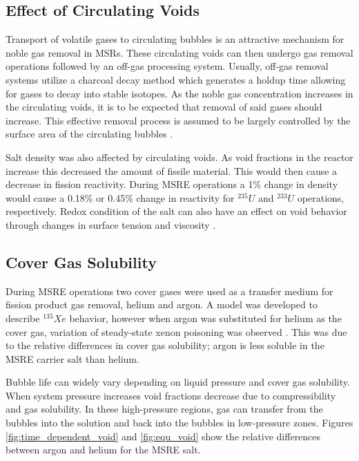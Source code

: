 \subsection{Effect of Circulating Voids}
Transport of volatile gases to circulating bubbles is an attractive mechanism for noble gas removal in MSRs. These circulating voids can then undergo gas removal operations followed by an off-gas processing system. Usually, off-gas removal systems utilize a charcoal decay method which generates a holdup time allowing for gases to decay into stable isotopes. As the noble gas concentration increases in the circulating voids, it is to be expected that removal of said gases should increase. This effective removal process is assumed to be largely controlled by the surface area of the circulating bubbles \cite{peebles1968}. 

Salt density was also affected by circulating voids. As void fractions in the reactor increase this decreased the amount of fissile material. This would then cause a decrease in fission reactivity. During MSRE operations a 1\% change in density would cause a 0.18\% or 0.45\% change in reactivity for ${}^{235}U$ and ${}^{233}U$ operations, respectively. Redox condition of the salt can also have an effect on void behavior through changes in surface tension and viscosity \cite{houtzeel1970}. 

\subsection{Cover Gas Solubility}

During MSRE operations two cover gases were used as a transfer medium for fission product gas removal, helium and argon. A model was developed to describe ${}^{135}Xe$ behavior, however when argon was substituted for helium as the cover gas, variation of steady-state xenon poisoning was observed \cite{engel1971}. This was due to the relative differences in cover gas solubility; argon is less soluble in the MSRE carrier salt than helium. 

Bubble life can widely vary depending on liquid pressure and cover gas solubility. When system pressure increases void fractions decrease due to compressibility and gas solubility. In these high-pressure regions, gas can transfer from the bubbles into the solution and back into the bubbles in low-pressure zones. Figures \ref{fig:time_dependent_void} and \ref{fig:equ_void} show the relative differences between argon and helium for the MSRE salt.

